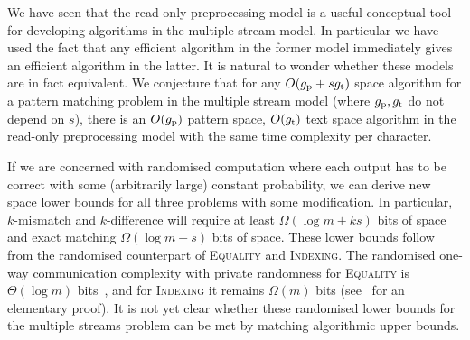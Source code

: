\documentclass[envcountsame]{llncs}
\newcommand{\indexing}{\textsc{Indexing}\xspace}
\newcommand{\equality}{\textsc{Equality}\xspace}
\begin{document}
We have seen that the read-only preprocessing model is a useful
conceptual tool for developing algorithms in the multiple stream
model. In particular we have used the fact that any efficient algorithm in the former model immediately gives an efficient algorithm in the latter. It is natural to wonder whether these models are in fact equivalent. We conjecture that for any $O(g_\textup{p} + sg_\textup{t})$ space algorithm for a pattern matching problem in the multiple stream model (where $g_\textup{p},g_\textup{t}$ do not depend on $s$), there is an $O(g_\textup{p})$ pattern space, $O(g_\textup{t})$ text space algorithm in the read-only preprocessing model with the same time complexity per character.


If we are concerned with
randomised computation where each output has to be correct with some
(arbitrarily large) constant probability, we can derive new space
lower bounds for all three problems with some modification. In particular, $k$-mismatch and
$k$-difference will require at least $\Omega(\log m + ks)$ bits of
space and exact matching  $\Omega(\log m + s)$ bits of space. These
lower bounds follow from the randomised counterpart of \equality and
\indexing. The randomised one-way communication complexity with private
randomness for \equality is $\Theta(\log m)$ bits~\cite{Yao:79}, and
for \indexing it remains $\Omega(m)$ bits (see~\cite{JKS:08} for an
elementary proof).  It is not yet clear whether these randomised lower bounds for
the multiple streams problem can be met by matching algorithmic upper bounds.





\end{document}

